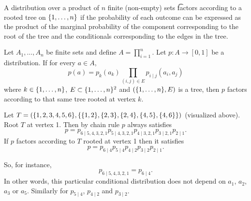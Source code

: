 A distribution over a product of $n$ finite (non-empty) sets \t{factors according to a rooted tree} on $\{1, \dots, n\}$ if the probability of each outcome can be expressed as the product of the marginal probability of the component corresponding to the root of the tree and the conditionals corresponding to the edges in the tree.


Let $A_1, \dots, A_n$ be finite sets and define $A = \prod_{i = 1}^{n}$.
Let $p: A \to [0, 1]$ be a distribution.
If for every $a \in A$, $$p(a) = p_k(a_k)\prod_{(i, j) \in E} p_{i \mid j}(a_i, a_j)$$ where $k \in \{1, \dots, n\}$, $E \subset \{1, \dots, n\}^2$ and $(\{1, \dots, n\}, E)$ is a tree, then $p$ factors according to that same tree rooted at vertex $k$.



Let $T = (\{1, 2, 3, 4, 5, 6\}, \{\{1, 2\}, \{2, 3\}, \{2, 4\}, \{4, 5\}, \{4, 6\}\})$ (visualized above). Root $T$ at vertex 1.
Then by chain rule $p$ always satisfies
$$
  p = p_{6 \mid 5, 4, 3, 2, 1}p_{5 \mid 4, 3, 2, 1}p_{4 \mid 3, 2, 1} p_{3 \mid 2, 1}p_{2 \mid 1}.
$$
If $p$ factors according to $T$ rooted at vertex 1 then it satisfies
$$
  p = p_{6 \mid 4}p_{5 \mid 4}p_{4 \mid 2}p_{3 \mid 2}p_{2 \mid 1}.
$$

So, for instance,
$$
  p_{6 \mid 5, 4, 3, 2, 1} = p_{6 \mid 4}.
$$
In other words, this particular conditional distribution does not depend on $a_1$, $a_2$, $a_3$ or $a_5$.
Similarly for $p_{5 \mid 4}$, $p_{4 \mid 2}$ and $p_{3 \mid 2}$.
\strats
